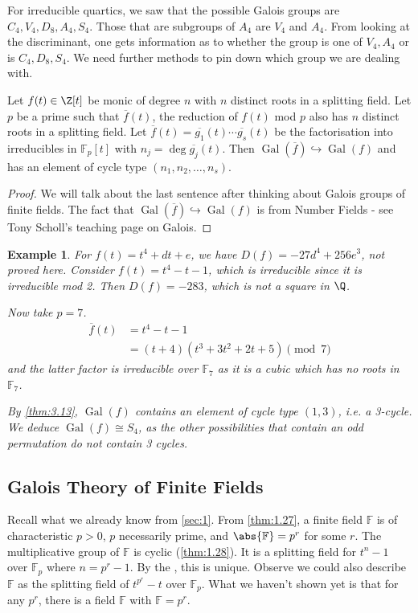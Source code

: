 \documentclass{article}
\DeclareMathOperator{\Gal}{Gal}
\newtheorem{nexample}[nthm]{Example}
\newcommand{\F}{\mathbb{F}}
\begin{document}
For irreducible quartics, we saw that the possible Galois groups are $C_4, V_4, D_8, A_4, S_4$.
Those that are subgroups of $A_4$ are $V_4$ and $A_4$.
From looking at the discriminant, one gets information as to whether the group is one of $V_4, A_4$ or is $C_4, D_8, S_4$.
We need further methods to pin down which group we are dealing with.

\begin{nthm}\label{thm:3.13}
    Let $f(t) \in \Z[t]$ be monic of degree $n$ with $n$ distinct roots in a splitting field.
    Let $p$ be a prime such that $\overline{f}(t)$, the reduction of $f(t)$ mod $p$ also has $n$ distinct roots in a splitting field.
    Let $\overline{f}(t) = \overline{g_1}(t) \dotsm \overline{g_s}(t)$ be the factorisation into irreducibles in $\F_p[t]$ with $n_j = \deg \overline{g_j}(t)$.
    Then $\Gal(\overline{f}) \hookrightarrow \Gal(f)$ and has an element of cycle type $(n_1, n_2, \dotsc, n_s)$.
\end{nthm}

\begin{proof}
    We will talk about the last sentence after thinking about Galois groups of finite fields.
    The fact that $\Gal(\overline{f}) \hookrightarrow \Gal(f)$ is from Number Fields - see Tony Scholl's teaching page on Galois.
\end{proof}

\begin{nexample}
    For $f(t) = t^4 + dt + e$, we have $D(f) = -27d^4 + 256 e^3$, not proved here.
    Consider $f(t) = t^4 - t - 1$, which is irreducible since it is irreducible mod 2.
    Then $D(f) = -283$, which is not a square in $\Q$.

    Now take $p=7$.
    \begin{align*}
        \overline{f}(t) &= t^4 - t - 1 \\
                        &= (t+4)(t^3 +3t^2 + 2t + 5) \pmod{7}
    \end{align*}
    and the latter factor is irreducible over $\F_7$ as it is a cubic which has no roots in $\F_7$.

    By \cref{thm:3.13}, $\Gal(f)$ contains an element of cycle type $(1,3)$, i.e. a 3-cycle.
    We deduce $\Gal(f) \cong S_4$, as the other possibilities that contain an odd permutation do not contain 3 cycles.
\end{nexample}

\subsection{Galois Theory of Finite Fields}
Recall what we already know from \cref{sec:1}.
From \cref{thm:1.27}, a finite field $\F$ is of characteristic $p>0$, $p$ necessarily prime, and $\abs{\F}=p^r$ for some $r$.
The multiplicative group of $\F$ is cyclic (\cref{thm:1.28}).
It is a splitting field for $t^n-1$ over $\F_p$ where $n = p^r - 1$.
By the , this is unique.
Observe we could also describe $\F$ as the splitting field of $t^{p^r}-t$ over $\F_p$.
What we haven't shown yet is that for any $p^r$, there is a field $\F$ with $\F = p^r$.
\end{document}
